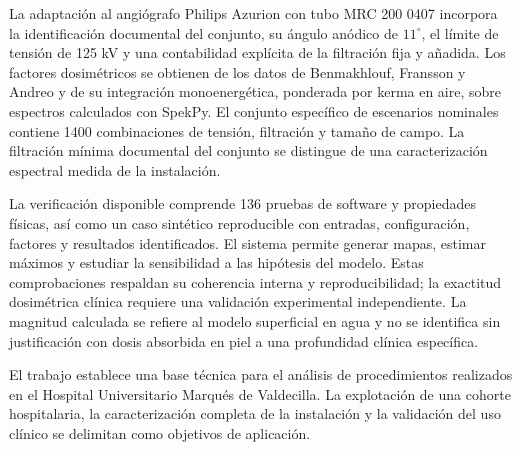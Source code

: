 \documentclass[11pt,a4paper,oneside]{report}
\begin{document}
La adaptación al angiógrafo Philips Azurion con tubo MRC 200 0407 incorpora la identificación documental del conjunto, su ángulo anódico de $11^\circ$, el límite de tensión de 125 kV y una contabilidad explícita de la filtración fija y añadida. Los factores dosimétricos se obtienen de los datos de Benmakhlouf, Fransson y Andreo y de su integración monoenergética, ponderada por kerma en aire, sobre espectros calculados con SpekPy. El conjunto específico de escenarios nominales contiene \num{1400} combinaciones de tensión, filtración y tamaño de campo. La filtración mínima documental del conjunto se distingue de una caracterización espectral medida de la instalación.

La verificación disponible comprende 136 pruebas de software y propiedades físicas, así como un caso sintético reproducible con entradas, configuración, factores y resultados identificados. El sistema permite generar mapas, estimar máximos y estudiar la sensibilidad a las hipótesis del modelo. Estas comprobaciones respaldan su coherencia interna y reproducibilidad; la exactitud dosimétrica clínica requiere una validación experimental independiente. La magnitud calculada se refiere al modelo superficial en agua y no se identifica sin justificación con dosis absorbida en piel a una profundidad clínica específica.

El trabajo establece una base técnica para el análisis de procedimientos realizados en el Hospital Universitario Marqués de Valdecilla. La explotación de una cohorte hospitalaria, la caracterización completa de la instalación y la validación del uso clínico se delimitan como objetivos de aplicación.

\tableofcontents
\listoffigures
\listoftables
\clearpage{}
















\clearpage{}


\appendix

\end{document}
